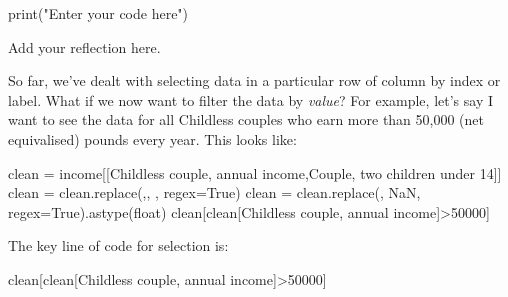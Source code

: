 \documentclass[
  letterpaper,
  DIV=11,
  numbers=noendperiod]{scrreprt}
\newenvironment{Shaded}{\begin{snugshade}}{\end{snugshade}}
\newcommand{\BuiltInTok}[1]{\textcolor[rgb]{0.00,0.23,0.31}{#1}}
\newcommand{\DecValTok}[1]{\textcolor[rgb]{0.68,0.00,0.00}{#1}}
\newcommand{\NormalTok}[1]{\textcolor[rgb]{0.00,0.23,0.31}{#1}}
\newcommand{\OperatorTok}[1]{\textcolor[rgb]{0.37,0.37,0.37}{#1}}
\newcommand{\StringTok}[1]{\textcolor[rgb]{0.13,0.47,0.30}{#1}}
\newcommand{\VariableTok}[1]{\textcolor[rgb]{0.07,0.07,0.07}{#1}}
\begin{document}
\begin{Shaded}
\begin{Highlighting}[]
\BuiltInTok{print}\NormalTok{(}\StringTok{"Enter your code here"}\NormalTok{)}
\end{Highlighting}
\end{Shaded}

\begin{Shaded}
\begin{Highlighting}[]
\NormalTok{Add your reflection here.}
\end{Highlighting}
\end{Shaded}

So far, we've dealt with selecting data in a particular row of column by
index or label. What if we now want to filter the data by \emph{value}?
For example, let's say I want to see the data for all Childless couples
who earn more than 50,000 (net equivalised) pounds every year. This
looks like:

\begin{Shaded}
\begin{Highlighting}[]
\NormalTok{clean }\OperatorTok{=}\NormalTok{ income[[}\StringTok{\textquotesingle{}Childless couple, annual income\textquotesingle{}}\NormalTok{,}\StringTok{\textquotesingle{}Couple, two children under 14\textquotesingle{}}\NormalTok{]]}
\NormalTok{clean }\OperatorTok{=}\NormalTok{ clean.replace(}\StringTok{\textquotesingle{},\textquotesingle{}}\NormalTok{, }\StringTok{\textquotesingle{}\textquotesingle{}}\NormalTok{, regex}\OperatorTok{=}\VariableTok{True}\NormalTok{)}
\NormalTok{clean }\OperatorTok{=}\NormalTok{ clean.replace(}\StringTok{\textquotesingle{}{-}\textquotesingle{}}\NormalTok{, }\StringTok{\textquotesingle{}NaN\textquotesingle{}}\NormalTok{, regex}\OperatorTok{=}\VariableTok{True}\NormalTok{).astype(}\StringTok{\textquotesingle{}float\textquotesingle{}}\NormalTok{)}
\NormalTok{clean[clean[}\StringTok{\textquotesingle{}Childless couple, annual income\textquotesingle{}}\NormalTok{]}\OperatorTok{\textgreater{}}\DecValTok{50000}\NormalTok{]}
\end{Highlighting}
\end{Shaded}

The key line of code for selection is:

\begin{Shaded}
\begin{Highlighting}[]
\NormalTok{clean[clean[}\StringTok{\textquotesingle{}Childless couple, annual income\textquotesingle{}}\NormalTok{]}\OperatorTok{\textgreater{}}\DecValTok{50000}\NormalTok{]}
\end{Highlighting}
\end{Shaded}
\end{document}
